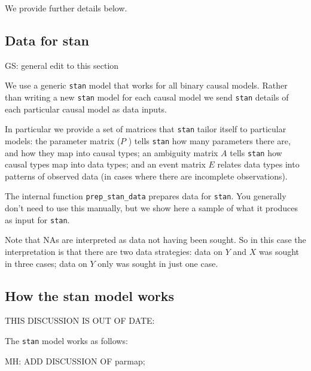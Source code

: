 \documentclass[
  article]{jss}
\begin{document}
We provide further details below.

\hypertarget{data-for-stan}{%
\subsection{Data for stan}\label{data-for-stan}}

GS: general edit to this section

We use a generic \texttt{stan} model that works for all binary causal
models. Rather than writing a new \texttt{stan} model for each causal
model we send \texttt{stan} details of each particular causal model as
data inputs.

In particular we provide a set of matrices that \texttt{stan} tailor
itself to particular models: the parameter matrix (\(P\) ) tells
\texttt{stan} how many parameters there are, and how they map into
causal types; an ambiguity matrix \(A\) tells \texttt{stan} how causal
types map into data types; and an event matrix \(E\) relates data types
into patterns of observed data (in cases where there are incomplete
observations).

The internal function \texttt{prep\_stan\_data} prepares data for
\texttt{stan}. You generally don't need to use this manually, but we
show here a sample of what it produces as input for \texttt{stan}.

Note that NAs are interpreted as data not having been sought. So in this
case the interpretation is that there are two data strategies: data on
\(Y\) and \(X\) was sought in three cases; data on \(Y\) only was sought
in just one case.

\hypertarget{how-the-stan-model-works}{%
\subsection{How the stan model works}\label{how-the-stan-model-works}}

THIS DISCUSSION IS OUT OF DATE:

The \texttt{stan} model works as follows:

MH: ADD DISCUSSION OF parmap;
\end{document}
